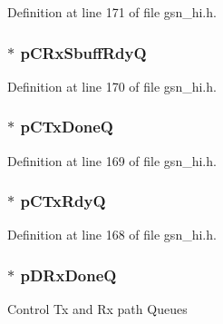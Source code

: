 Definition at line 171 of file gsn\_\-hi.h.

\hypertarget{a00085_ab20687f47d0ed918374f7bf6370bb279}{
\subsubsection[{pCRxSbuffRdyQ}]{$\ast$ {\bf pCRxSbuffRdyQ}}}
\label{a00085_ab20687f47d0ed918374f7bf6370bb279}


Definition at line 170 of file gsn\_\-hi.h.

\hypertarget{a00085_a8320fe53c3c7badf5055f94062578356}{
\subsubsection[{pCTxDoneQ}]{$\ast$ {\bf pCTxDoneQ}}}
\label{a00085_a8320fe53c3c7badf5055f94062578356}


Definition at line 169 of file gsn\_\-hi.h.

\hypertarget{a00085_a3013d653b790349c653bceeca0ab840d}{
\subsubsection[{pCTxRdyQ}]{$\ast$ {\bf pCTxRdyQ}}}
\label{a00085_a3013d653b790349c653bceeca0ab840d}


Definition at line 168 of file gsn\_\-hi.h.

\hypertarget{a00085_a530d01c3ee745926054e01e8cc690ccf}{
\subsubsection[{pDRxDoneQ}]{$\ast$ {\bf pDRxDoneQ}}}
\label{a00085_a530d01c3ee745926054e01e8cc690ccf}
Control Tx and Rx path Queues 

